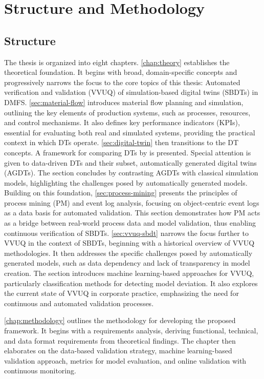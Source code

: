 \section{Structure and Methodology}

\subsection*{Structure}
The thesis is organized into eight chapters.
\autoref{chap:theory} establishes the theoretical foundation. It begins with broad, domain-specific concepts and progressively narrows the focus to the core topics of this thesis: Automated verification and validation (VVUQ) of simulation-based digital twins (SBDTs) in DMFS.
\autoref{sec:material-flow} introduces material flow planning and simulation, outlining the key elements of production systems, such as processes, resources, and control mechanisms. It also defines key performance indicators (KPIs), essential for evaluating both real and simulated systems, providing the practical context in which DTs operate.
\autoref{sec:digital-twin} then transitions to the DT concepts. A framework for comparing DTs by \textcite{schwede2024learning} is presented. Special attention is given to data-driven DTs and their subset, automatically generated digital twins (AGDTs). The section concludes by contrasting AGDTs with classical simulation models, highlighting the challenges posed by automatically generated models.
Building on this foundation, \autoref{sec:process-mining} presents the principles of process mining (PM) and event log analysis, focusing on object-centric event logs as a data basis for automated validation. This section demonstrates how PM acts as a bridge between real-world process data and model validation, thus enabling continuous verification of SBDTs.
\autoref{sec:vvuq-sbdt} narrows the focus further to VVUQ in the context of SBDTs, beginning with a historical overview of VVUQ methodologies. It then addresses the specific challenges posed by automatically generated models, such as data dependency and lack of transparency in model creation. The section introduces machine learning-based approaches for VVUQ, particularly classification methods for detecting model deviation. It also explores the current state of VVUQ in corporate practice, emphasizing the need for continuous and automated validation processes.

\autoref{chap:methodology} outlines the methodology for developing the proposed framework. It begins with a requirements analysis, deriving functional, technical, and data format requirements from theoretical findings. The chapter then elaborates on the data-based validation strategy, machine learning-based validation approach, metrics for model evaluation, and online validation with continuous monitoring.

